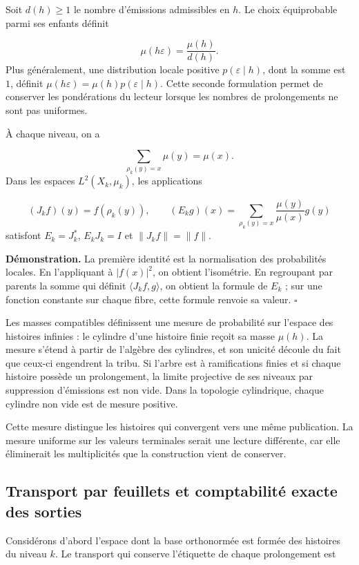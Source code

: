 Soit \(d(h)\geq1\) le nombre d'émissions admissibles en \(h\). Le choix équiprobable parmi ses enfants définit

\[
\mu(h\varepsilon)=\frac{\mu(h)}{d(h)}.
\]
Plus généralement, une distribution locale positive \(p(\varepsilon\mid h)\), dont la somme est \(1\), définit \(\mu(h\varepsilon)=\mu(h)p(\varepsilon\mid h)\). Cette seconde formulation permet de conserver les pondérations du lecteur lorsque les nombres de prolongements ne sont pas uniformes.

À chaque niveau, on a

\[
\sum_{\rho_k(y)=x}\mu(y)=\mu(x).
\]
Dans les espaces \(L^2(X_k,\mu_k)\), les applications

\[
(J_kf)(y)=f(\rho_k(y)),
\qquad
(E_kg)(x)=\sum_{\rho_k(y)=x}\frac{\mu(y)}{\mu(x)}g(y)
\]
satisfont \(E_k=J_k^*\), \(E_kJ_k=I\) et \(\|J_kf\|=\|f\|\).

\textbf{Démonstration.} La première identité est la normalisation des probabilités locales. En l'appliquant à \(|f(x)|^2\), on obtient l'isométrie. En regroupant par parents la somme qui définit \(\langle J_kf,g\rangle\), on obtient la formule de \(E_k\) ; sur une fonction constante sur chaque fibre, cette formule renvoie sa valeur. \hfill\(\square\)

Les masses compatibles définissent une mesure de probabilité sur l’espace des histoires infinies : le cylindre d’une histoire finie reçoit sa masse \(\mu(h)\). La mesure s’étend à partir de l’algèbre des cylindres, et son unicité découle du fait que ceux-ci engendrent la tribu. Si l’arbre est à ramifications finies et si chaque histoire possède un prolongement, la limite projective de ses niveaux par suppression d’émissions est non vide. Dans la topologie cylindrique, chaque cylindre non vide est de mesure positive.

Cette mesure distingue les histoires qui convergent vers une même publication. La mesure uniforme sur les valeurs terminales serait une lecture différente, car elle éliminerait les multiplicités que la construction vient de conserver.

\subsection{Transport par feuillets et comptabilité exacte des sorties}
Considérons d'abord l'espace dont la base orthonormée est formée des histoires du niveau \(k\). Le transport qui conserve l'étiquette de chaque prolongement est

